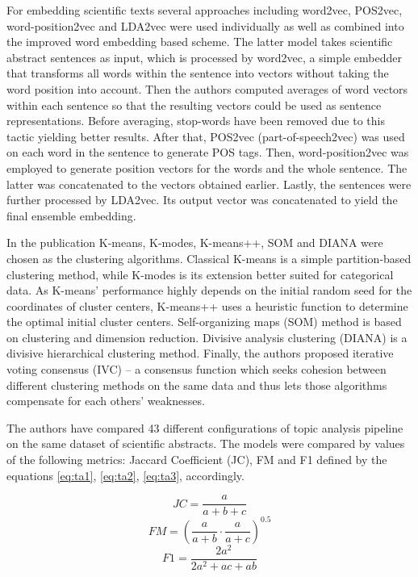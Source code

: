 \documentclass[3p,times,procedia]{elsarticle}
\begin{document}
For embedding scientific texts several approaches including word2vec, POS2vec, word-position2vec and LDA2vec were used individually as well as combined into the improved word embedding based scheme. The latter model takes scientific abstract sentences as input, which is processed by word2vec, a simple embedder that transforms all words within the sentence into vectors without taking the word position into account. Then the authors computed averages of word vectors within each sentence so that the resulting vectors could be used as sentence representations. Before averaging, stop-words have been removed due to this tactic yielding better results. After that, POS2vec (part-of-speech2vec) was used on each word in the sentence to generate POS tags. Then, word-position2vec was employed to generate position vectors for the words and the whole sentence. The latter was concatenated to the vectors obtained earlier. Lastly, the sentences were further processed by LDA2vec. Its output vector was concatenated to yield the final ensemble embedding.

In the publication K-means, K-modes, K-means++, SOM and DIANA were chosen as the clustering algorithms. Classical K-means is a simple partition-based clustering method, while K-modes is its extension better suited for categorical data. As K-means' performance highly depends on the initial random seed for the coordinates of cluster centers, K-means++ uses a heuristic function to determine the optimal initial cluster centers. Self-organizing maps (SOM) method is based on clustering and dimension reduction. Divisive analysis clustering (DIANA) is a divisive hierarchical clustering method. Finally, the authors proposed iterative voting consensus (IVC) -- a consensus function which seeks cohesion between different clustering methods on the same data and thus lets those algorithms compensate for each others' weaknesses.

The authors have compared 43 different configurations of topic analysis pipeline on the same dataset of scientific abstracts. The models were compared by values of the following metrics: Jaccard Coefficient (JC), FM and F1 defined by the equations \ref{eq:ta1}, \ref{eq:ta2}, \ref{eq:ta3}, accordingly.

\begin{equation} \label{eq:ta1}
JC = \frac{a}{a+b+c}
\end{equation}
\begin{equation} \label{eq:ta2}
FM = \left( \frac{a}{a+b} \cdot \frac{a}{a+c} \right)^{0.5}
\end{equation}
\begin{equation} \label{eq:ta3}
F1 = \frac{2a^2}{2a^2 + ac + ab}
\end{equation}
\end{document}
